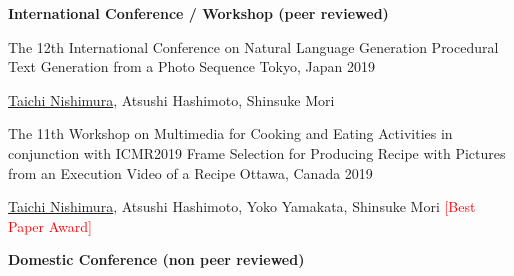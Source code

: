 \par
{\bf International Conference / Workshop (peer reviewed)}
\begin{cventries}
  \cventry
    {The 12th International Conference on Natural Language Generation}
    {Procedural Text Generation from a Photo Sequence}
    {Tokyo, Japan}
    {2019}
    {
      \begin{cvitems}
      \item {\underline{Taichi Nishimura}, Atsushi Hashimoto, Shinsuke Mori}
      \end{cvitems}
    }
  \cventry
    {The 11th Workshop on Multimedia for Cooking and Eating Activities in conjunction with ICMR2019} %
    {Frame Selection for Producing Recipe with Pictures from an Execution Video of a Recipe} %
    {Ottawa, Canada} %
    {2019} %
    {
      \begin{cvitems} %
        \item {\underline{Taichi Nishimura}, Atsushi Hashimoto, Yoko Yamakata, Shinsuke Mori \textcolor{red}{[Best Paper Award]}}
      \end{cvitems}
    }
\end{cventries}
\par
{\bf Domestic Conference (non peer reviewed)}
